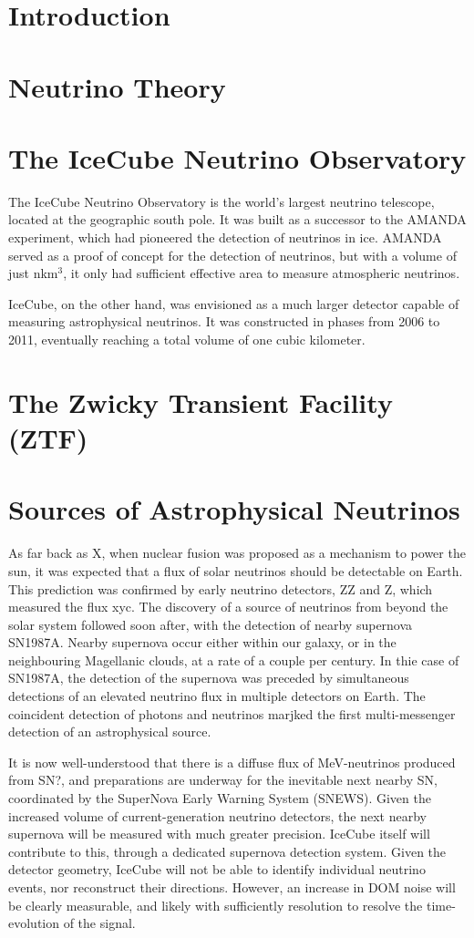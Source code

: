 \documentclass[]{article}
\begin{document}
\section{Introduction}
\section{Neutrino Theory}
\section{The IceCube Neutrino Observatory}
The IceCube Neutrino Observatory is the world's largest neutrino telescope, located at the geographic south pole. It was built as a successor to the AMANDA experiment, which had pioneered the detection of neutrinos in ice. AMANDA served as a proof of concept for the detection of neutrinos, but with a volume of just nkm$^{3}$, it only had sufficient effective area to measure atmospheric neutrinos. 

IceCube, on the other hand, was envisioned as a much larger detector capable of measuring astrophysical neutrinos. It was constructed in phases from 2006 to 2011, eventually reaching a total volume of one cubic kilometer. 
\section{The Zwicky Transient Facility (ZTF)}
\section{Sources of Astrophysical Neutrinos}
As far back as X, when nuclear fusion was proposed as a mechanism to power the sun, it was expected that a flux of solar neutrinos should be detectable on Earth. This prediction was confirmed by early neutrino detectors, ZZ and Z, which measured the flux xyc.
The discovery of a source of neutrinos from beyond the solar system followed soon after, with the detection of nearby supernova SN1987A. Nearby supernova occur either within our galaxy, or in the neighbouring Magellanic clouds, at a rate of a couple per century. In thie case of SN1987A, the detection of the supernova was preceded by simultaneous detections of an elevated neutrino flux in multiple detectors on Earth. The coincident detection of photons and neutrinos marjked the first multi-messenger detection of an astrophysical source.

It is now well-understood that there is a diffuse flux of MeV-neutrinos produced from SN?, and preparations are underway for the inevitable next nearby SN, coordinated by the SuperNova Early Warning System (SNEWS). Given the increased volume of current-generation neutrino detectors, the next nearby supernova will be measured with much greater precision. IceCube itself will contribute to this, through a dedicated supernova detection system. Given the detector geometry, IceCube will not be able to identify individual neutrino events, nor reconstruct their directions. However, an increase in DOM noise will be clearly measurable, and likely with sufficiently resolution to resolve the time-evolution of the signal. 
\end{document}
